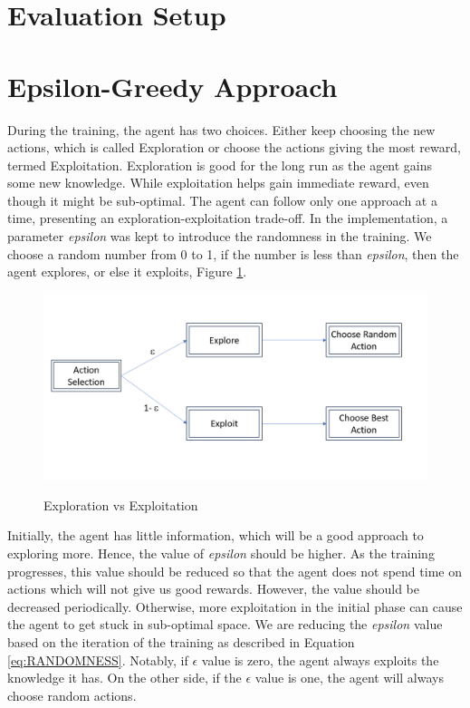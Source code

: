 \documentclass[logo,msc]{infthesis}           %
\begin{document}
\section{Evaluation Setup}

\section{Epsilon-Greedy Approach}

During the training, the agent has two choices. Either keep choosing the new actions, which is called Exploration or choose the actions giving the most reward, termed Exploitation. Exploration is good for the long run as the agent gains some new knowledge. While exploitation helps gain immediate reward, even though it might be sub-optimal. The agent can follow only one approach at a time, presenting an exploration-exploitation trade-off. In the implementation, a parameter \textit{epsilon} was kept to introduce the randomness in the training. We choose a random number from 0 to 1, if the number is less than \textit{epsilon}, then the agent explores, or else it exploits, Figure \ref{fig:randomness}.

\begin{figure}[htbp]
  \centering
  \includegraphics[width=\textwidth]{Images/Randomness.png}
  \label{fig:randomness}  
  \caption{Exploration vs Exploitation}
\end{figure}

Initially, the agent has little information, which will be a good approach to exploring more. Hence, the value of \textit{epsilon} should be higher. As the training progresses, this value should be reduced so that the agent does not spend time on actions which will not give us good rewards. However, the value should be decreased periodically. Otherwise, more exploitation in the initial phase can cause the agent to get stuck in sub-optimal space. We are reducing the \textit{epsilon} value based on the iteration of the training as described in Equation \ref{eq:RANDOMNESS}. Notably, if {$\epsilon$} value is zero, the agent always exploits the knowledge it has. On the other side, if the {$\epsilon$} value is one, the agent will always choose random actions.
\end{document}
